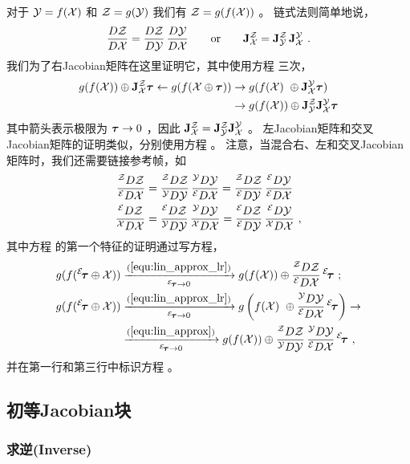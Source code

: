 对于 $\mathcal{Y}=f(\mathcal{X})$ 和 $\mathcal{Z}=g(\mathcal{Y})$ 我们有 $\mathcal{Z}=g(f(\mathcal{X}))$ 。
链式法则简单地说，
%
\begin{align}
\frac{D\mathcal{Z}}{D\mathcal{X}} = \frac{D\mathcal{Z}}{D\mathcal{Y}}\,\frac{D\mathcal{Y}}{D\mathcal{X}}
\qquad \textrm{or} \qquad
{{\bf J}^{\mathcal{Z}}_{\mathcal{X}}} = {{\bf J}^{\mathcal{Z}}_{\mathcal{Y}}}\,{{\bf J}^{\mathcal{Y}}_{\mathcal{X}}}
~.
\end{align}
%
我们为了右Jacobian矩阵在这里证明它，其中使用方程  三次，
%
\begin{align*}
g(f(\mathcal{X}))\oplus{{\bf J}^{\mathcal{Z}}_{\mathcal{X}}}{\bm \tau} \gets g(f(\mathcal{X}\oplus{\bm \tau})) &\to g(f(\mathcal{X})~\oplus{{\bf J}^{\mathcal{Y}}_{\mathcal{X}}}{\bm \tau}) 
  \\
  &\to g(f(\mathcal{X}))\oplus{{\bf J}^{\mathcal{Z}}_{\mathcal{Y}}}{{\bf J}^{\mathcal{Y}}_{\mathcal{X}}}{\bm \tau}
\end{align*}
%
其中箭头表示极限为 ${\bm \tau}\to0$ ，因此 ${{\bf J}^{\mathcal{Z}}_{\mathcal{X}}}={{\bf J}^{\mathcal{Z}}_{\mathcal{Y}}}{{\bf J}^{\mathcal{Y}}_{\mathcal{X}}}$ 。
左Jacobian矩阵和交叉Jacobian矩阵的证明类似，分别使用方程  。
%
注意，当混合右、左和交叉Jacobian矩阵时，我们还需要链接参考帧，如
%
\begin{align}
\rldpar{\cZ}{\cX}
  &= \rrdpar{\cZ}{\cY}\,\rldpar{\cY}{\cX}
  = \rldpar{\cZ}{\cY}\,\lldpar{\cY}{\cX} \label{equ:chain_rule_cross_1}
\\
\lrdpar{\cZ}{\cX}
  &= \lrdpar{\cZ}{\cY}\,\rrdpar{\cY}{\cX}
  = \lldpar{\cZ}{\cY}\,\lrdpar{\cY}{\cX}\label{equ:chain_rule_cross_2}
~,
\end{align}
%
其中方程  的第一个特征的证明通过写方程，
%
\begin{align*}
g(f({^\cE\!\bftau}\op\cX)) 
  &\xrightarrow[{^\cE\!\bftau}\to0]{\eqRef{equ:lin_approx_lr}} 
  g(f(\cX))\op\rldpar{\cZ}{\cX}\,{^\cE}\!\bftau
  ~; \\ 
g(f({^\cE\!\bftau}\op\cX)) 
  &\xrightarrow[{^\cE\!\bftau}\to0]{\eqRef{equ:lin_approx_lr}} 
  g\left(f(\cX)~\op\rldpar{\cY}{\cX}\,{^\cE}\!\bftau\right) \to
  \\
  &\xrightarrow[{^\cE\!\bftau}\to0]{\eqRef{equ:lin_approx}} 
  g(f(\cX))\op\rrdpar{\cZ}{\cY}\,\rldpar{\cY}{\cX}\,{^\cE}\!\bftau 
~,
\end{align*}
%
并在第一行和第三行中标识方程  。


\subsection{初等Jacobian块}
\label{sec:jacs_elementary}

\subsubsection{求逆(Inverse)}
\label{sec:Jac_inversion}

